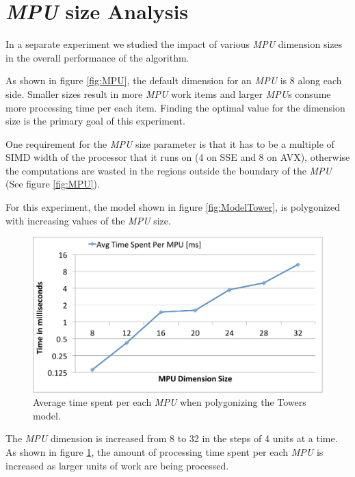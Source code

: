 \section{\textit{MPU} size Analysis}
\label{sec:ExperimentWithMPUDimensionSize}
In a separate experiment we studied the impact of various \textit{MPU} dimension 
sizes in the overall performance of the algorithm. 

As shown in figure \ref{fig:MPU}, the default dimension for an \textit{MPU} is 8 
along each side. Smaller sizes result in more \textit{MPU} work items and larger \textit{MPU}s consume
more processing time per each item. Finding the optimal value for the dimension size
is the primary goal of this experiment. 

One requirement for the \textit{MPU} size parameter is that it has to be a multiple of SIMD width of
the processor that it runs on (4 on SSE and 8 on AVX), otherwise the computations are wasted in the 
regions outside the boundary of the \textit{MPU} (See figure \ref{fig:MPU}).

For this experiment, the model shown in figure \ref{fig:ModelTower}, is polygonized with increasing 
values of the \textit{MPU} size. 

\begin{figure}[H]
  \centering
  \includegraphics[width = 1.0\linewidth]{figures/cpupoly/MpuSizeAnalysis/AvgTimeSpentPerMPU.pdf}
  \caption{\label{fig:AvgTimeSpentPerMPU}
  {Average time spent per each \textit{MPU} when polygonizing the Towers model.}
}
\end{figure}

The \textit{MPU} dimension is increased from 8 to 32 in the steps of 4 units at a time. As shown in
figure \ref{fig:AvgTimeSpentPerMPU}, the amount of processing time spent per each \textit{MPU} is increased 
as larger units of work are being processed. 


